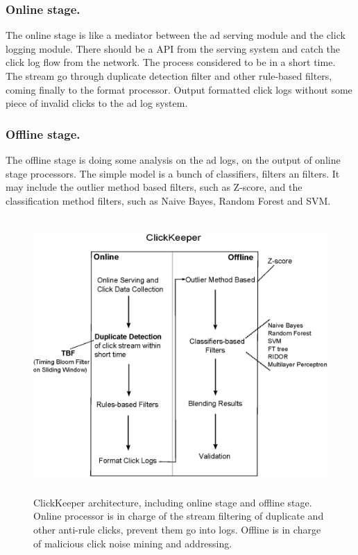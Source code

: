 \documentclass[runningheads,report]{llncs}
\begin{document}
\subsubsection{Online stage.}
The online stage is like a mediator between the ad serving module and the click logging module. There should be a API from the serving system and catch the click log flow from the network. The process considered to be in a short time. The stream go through duplicate detection filter and other rule-based filters, coming finally to the format processor. Output formatted click logs without some piece of invalid clicks to the ad log system.

\subsubsection{Offline stage.}
The offline stage is doing some analysis on the ad logs, on the output of online stage processors. The simple model is a bunch of classifiers, filters an filters. It may include the outlier method based filters, such as Z-score, and the classification method filters, such as Naive Bayes, Random Forest and SVM.  

\begin{figure}
\centering
\includegraphics[height=10.5cm]{pic/clickKeeper}
\caption{ClickKeeper architecture, including online stage and offline stage. Online processor is in charge of the stream filtering of duplicate and other anti-rule clicks, prevent them go into logs. Offline is in charge of malicious click noise mining and addressing.}
\label{fig:clickKeeper}
\end{figure}
\end{document}
